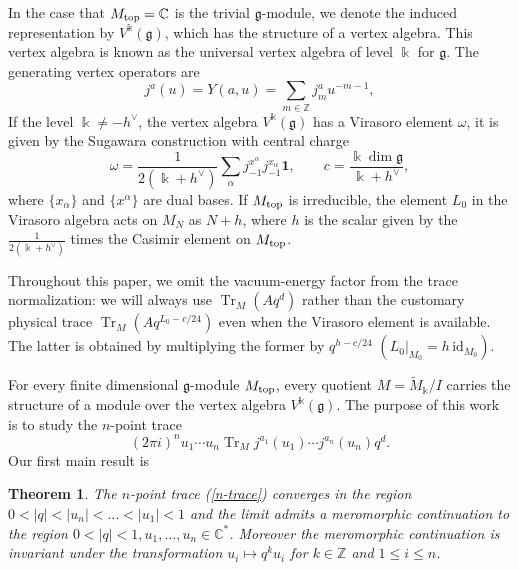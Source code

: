 \documentclass[11pt,a4paper]{amsart}
\numberwithin{equation}{section}
\newtheorem{maintheorem}{Theorem}
\theoremstyle{definition}
\theoremstyle{remark}
\DeclareMathOperator{\Tr}{Tr}
\newcommand{\CC}{\mathbb C}
\newcommand{\ZZ}{\mathbb Z}
\newcommand{\g}{\mathfrak g}
\newcommand{\kk}{\Bbbk}
\newcommand{\one}{\mathbf 1}
\begin{document}
In the case that $ M_{\rm top} = \CC$ is the trivial $ \g$-module,  we denote the induced representation by $V^{\kk} ( \g ) $, which has the structure of  a vertex algebra. This vertex algebra is known as the universal vertex algebra of level $\kk$ for $\g $. The generating vertex operators are
\begin{equation}
j^a(u)=Y(a,u)=\sum_{m\in\ZZ}j_m^a u^{-m-1},
\label{eq:plane-current}
\end{equation}
If the level $\kk\neq-h^\vee$, the vertex algebra $V^{\kk } ( \g ) $ has a Virasoro element $\omega $, it is given by  the Sugawara construction with 
central charge 
\begin{equation}
\omega=\frac{1}{2(\kk+h^\vee)}
\sum_\alpha j_{-1}^{x^\alpha}j_{-1}^{x_\alpha}\one,
\qquad
c=\frac{\kk\dim\g}{\kk+h^\vee},
\label{eq:sugawara}
\end{equation}
where $\{x_\alpha\}$ and $\{x^\alpha\}$ are dual bases. If $M_{\rm top}$ is irreducible,  the element $L_0 $ in the Virasoro algebra acts on $M_N$ as $N+h$, where $h$ is the scalar given by the $ \frac{1}{2(\kk+h^\vee)}$ times the Casimir element on $ M_{\rm top}$.


Throughout this paper, we omit the vacuum-energy factor from the trace
normalization: we will always use
$\Tr_M(Aq^d)$ rather than the customary physical trace
$\Tr_M(Aq^{L_0-c/24})$ even when the Virasoro element is available. The latter is obtained by multiplying the former
by $q^{h-c/24}$ $(L_0|_{M_0}=h\,\mathrm{id}_{M_0})$. 


For every finite dimensional $\g $-module $M_{\rm top}$, every quotient  $M =   \widetilde{ M}_{ \kk  } /  I $ carries the structure of a module over the vertex algebra $ V^{\kk} ( \g )$. The purpose of this work is to study the $n$-point trace 
\begin{equation} \label{n-trace}
( 2\pi i )^n   u_1 \cdots u_n   \Tr_M  j^{a_1} ( u_1 ) \cdots j^{a_n} ( u_n ) q^d .   
\end{equation}
Our first main result is 


\begin{maintheorem}\label{theoremA}
	The $n$-point trace (\ref{n-trace}) converges in the region $  0 < |q| < |u_n| < \dots < |u_1| < 1 $ and the limit admits a meromorphic continuation to the region $ 0 <|q|<1 ,  u_1 , \dots , u_n \in \CC^* $. Moreover the meromorphic continuation is invariant under the transformation $ u_i \mapsto q^k u_i $ for $ k \in \ZZ $ and $1\leq i \leq n$.
\end{maintheorem}
\end{document}
